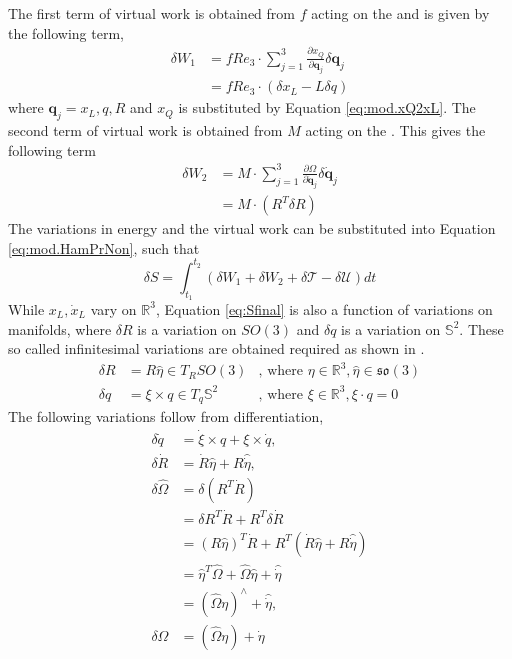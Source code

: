 The first term of virtual work is obtained from $ f $ acting on the  and is given by the following term,
\begin{equation}\label{key}
\begin{aligned}
\delta W_1&=fRe_3\cdot \sum_{j=1}^{3}\frac{\partial x_Q}{\partial \mathbf{q}_j}\delta \mathbf{q}_j\\
&=fRe_3\cdot(\delta x_L-L\delta q)
\end{aligned}
\end{equation}
where $ \mathbf{q}_j={x_L,q,R} $ and $ x_Q $ is substituted by Equation \ref{eq:mod.xQ2xL}.
The second term of virtual work is obtained from $ M $ acting on the . This gives the following term
\begin{equation}\label{key}
\begin{aligned}
\delta W_2&=M\cdot \sum_{j=1}^{3}\frac{\partial\Omega}{\partial \mathbf{\dot{q}}_j}\delta \mathbf{\dot{q}}_j\\
&=M\cdot(R^T\delta R)
\end{aligned}\end{equation}
The variations in energy and the virtual work can be substituted into Equation \ref{eq:mod.HamPrNon}, such that
\begin{equation}\label{eq:Sfinal}
\delta S = \int_{t_1}^{t_2}(\delta W_1+\delta W_2+\delta\mathcal{T}-\delta\mathcal{U})dt
\end{equation}
While $ x_L,\dot{x}_L $ vary on $ \mathbb{R}^3 $, Equation \ref{eq:Sfinal} is also a function of variations on manifolds, where $ \delta R $ is a variation on $ SO(3) $ and $ \delta q $ is a variation on $ \mathbb{S}^2 $. These so called infinitesimal variations are obtained required as shown in  \cite{Lee2005,Lee2011,Bullo2005,Sreenath2013c}. 
\begin{equation}\label{key}
\begin{aligned}
\delta R&=R\hat{\eta}\in T_RSO(3)&\text{, where } \eta\in\mathbb{R}^3,\hat{\eta}\in\mathfrak{so}(3)\\
\delta q&=\xi\times q \in T_q\mathbb{S}^2&\text{, where }\xi\in\mathbb{R}^3,\xi\cdot q=0
\end{aligned}
\end{equation}
The following variations follow from differentiation,
\begin{equation}\label{key}
\begin{aligned}
\delta \dot{q}&=\dot{\xi}\times q+\xi\times\dot{q},\\
\delta \dot{R}&=\dot{R}\hat{\eta}+R\hat{\dot{\eta}},\\
\delta \hat{\Omega}&=\delta(R^T\dot{R})\\
&=\delta R^T\dot{R}+R^T\delta\dot{R}\\
&=(R\hat{\eta})^T\dot{R}+R^T (\dot{R}\hat{\eta}+R\hat{\dot{\eta}})\\
&=\hat{\eta}^T\hat{\Omega}+\hat{\Omega}\hat{\eta}+\hat{\dot{\eta}}\\
&=({\hat{\Omega}\eta})^\wedge+\hat{\dot{\eta}},\\
\delta\Omega&=({\hat{\Omega}\eta})+{\dot{\eta}}
\end{aligned}
\end{equation}

